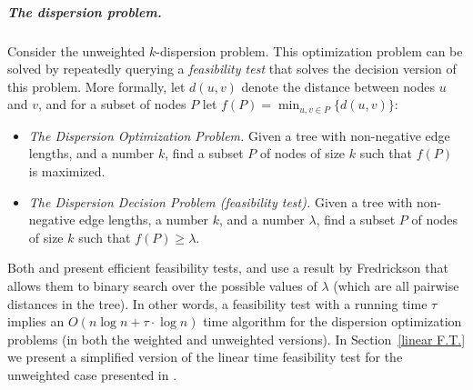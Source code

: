 \documentclass[a4paper,UKenglish]{lipics-v2016}
\theoremstyle{plain}
\newcommand{\Oh}{{O}}
\renewcommand{\paragraph}{\subparagraph}
\begin{document}
\paragraph{The dispersion problem.}
Consider the unweighted $k$-dispersion problem. This optimization problem can be solved by repeatedly querying a {\em feasibility test} that solves the decision version of this problem. More formally, let $d(u,v)$ denote the distance between nodes $u$ and $v$, and for a subset of nodes $P$ let $f(P)=\min_{u,v\in P} \{d(u,v)\}$:


\begin{itemize} 
\item {\em The Dispersion Optimization Problem.} Given a tree with non-negative edge lengths, and a  number $k$, find a subset $P$ of nodes of size $k$ such that $f(P)$ is maximized. 

\item  {\em The Dispersion Decision Problem (feasibility test).}  Given a tree with non-negative edge lengths, a number $k$, and a number $\lambda$, find a subset $P$ of nodes of size $k$ such that  $f(P)\geq\lambda$. 
\end{itemize}

Both \cite{Bhattacharya1991} and \cite{Bhattacharya1999} present efficient feasibility tests, and use a result by Fredrickson \cite{Frederickson1983} that allows them to binary search over the possible values of $\lambda$ (which are all pairwise distances in the tree). In other words, a feasibility test with a running time $\tau$  implies an $O(n \log n + \tau \cdot \log n)$ time algorithm for the dispersion optimization problems (in both the weighted and unweighted versions). In Section~\ref{linear F.T.} we present a simplified version of the linear time feasibility test for the unweighted case presented in \cite{Bhattacharya1991}.
 
\end{document}

